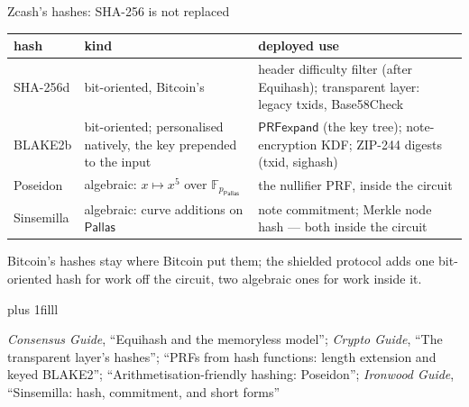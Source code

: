 \documentclass[aspectratio=169,11pt]{beamer}
\newcommand{\F}{\mathbb{F}}
\newcommand{\Pallas}{\ensuremath{\mathsf{Pallas}}}
\newcommand{\Fpp}{\ensuremath{\F_{p_{\Pallas}}}}
\newcommand{\src}[1]{\par\vskip0pt plus 1filll
  {\fontsize{6}{7.2}\selectfont\color{arbdim}\raggedright #1\par}}
\begin{document}
\begin{frame}{Zcash's hashes: SHA-256 is not replaced}
\begin{center}\small
\begin{tabular}{@{}lp{}p{}@{}}
\toprule
hash & kind & deployed use \\
\midrule
SHA-256d & \raggedright bit-oriented, Bitcoin's & \raggedright header
  difficulty filter (after Equihash); transparent layer: legacy txids,
  Base58Check \tabularnewline
BLAKE2b & \raggedright bit-oriented; personalised natively, the key
  prepended to the input &
  \raggedright $\mathsf{PRFexpand}$ (the key tree); note-encryption KDF;
  ZIP-244 digests (txid, sighash) \tabularnewline
Poseidon & \raggedright algebraic: $x \mapsto x^{5}$ over $\Fpp$ &
  \raggedright the nullifier PRF, inside the circuit \tabularnewline
Sinsemilla & \raggedright algebraic: curve additions on \Pallas{} &
  \raggedright note commitment; Merkle node hash --- both inside the
  circuit \tabularnewline
\bottomrule
\end{tabular}
\end{center}
\smallskip
Bitcoin's hashes stay where Bitcoin put them; the shielded protocol adds
one bit-oriented hash for work off the circuit, two algebraic ones for work
inside it.
\par\smallskip
{}
\src{\emph{Consensus Guide}, ``Equihash and the memoryless model'';
  \emph{Crypto Guide}, ``The transparent layer's hashes''; ``PRFs from hash
  functions: length extension and keyed BLAKE2''; ``Arithmetisation-friendly
  hashing: Poseidon''; \emph{Ironwood Guide}, ``Sinsemilla: hash,
  commitment, and short forms''}
\end{frame}
\end{document}

